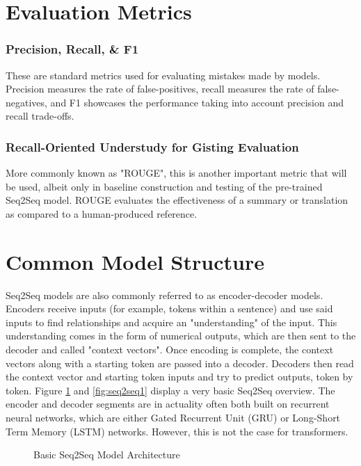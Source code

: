 \documentclass[12pt]{report}
\begin{document}
    \section{Evaluation Metrics}
            \subsubsection{Precision, Recall, \& F1}
            These are standard metrics used for evaluating mistakes made by models. Precision measures the rate of false-positives, recall measures the rate of false-negatives, and F1 showcases the performance taking into account precision and recall trade-offs.
            
            \subsubsection{Recall-Oriented Understudy for Gisting Evaluation}
            More commonly known as "ROUGE", this is another important metric that will be used, albeit only in baseline construction and testing of the pre-trained Seq2Seq model. ROUGE evaluates the effectiveness of a summary or translation as compared to a human-produced reference.

    \section{Common Model Structure}
        Seq2Seq models are also commonly referred to as encoder-decoder models. Encoders receive inputs (for example, tokens within a sentence) and use said inputs to find relationships and acquire an "understanding" of the input. This understanding comes in the form of numerical outputs, which are then sent to the decoder and called "context vectors". Once encoding is complete, the context vectors along with a starting token are passed into a decoder. Decoders then read the context vector and starting token inputs and try to predict outputs, token by token. Figure \ref{fig:seq2seq} and \ref{fig:seq2seq1} display a very basic Seq2Seq overview. The encoder and decoder segments are in actuality often both built on recurrent neural networks, which are either Gated Recurrent Unit (GRU) or Long-Short Term Memory (LSTM) networks. However, this is not the case for transformers.
        
        \begin{figure}[H]
            \centering
            \makebox[\textwidth]{}
            \caption{Basic Seq2Seq Model Architecture~\cite{HF_course}}
            \label{fig:seq2seq}
        \end{figure}
        
\end{document}
